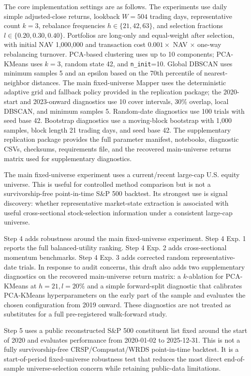 \documentclass[runningheads]{llncs}
\begin{document}
The core implementation settings are as follows. The experiments use daily simple adjusted-close returns, lookback $W=504$ trading days, representative count $k=3$, rebalance frequencies $h\in\{21,42,63\}$, and selection fractions $l\in\{0.20,0.30,0.40\}$. Portfolios are long-only and equal-weight after selection, with initial NAV 1,000,000 and transaction cost $0.001\times$ NAV $\times$ one-way rebalancing turnover. PCA-based clustering uses up to 10 components; PCA-KMeans uses $k=3$, random state 42, and \texttt{n\_init}=10. Global DBSCAN uses minimum samples 5 and an epsilon based on the 70th percentile of nearest-neighbor distances. The main fixed-universe Mapper uses the deterministic adaptive grid and fallback policy provided in the replication package; the 2020-start and 2023-onward diagnostics use 10 cover intervals, 30\% overlap, local DBSCAN, and minimum samples 5. Random-date diagnostics use 100 trials with seed base 42. Bootstrap diagnostics use a moving-block bootstrap with 1,000 samples, block length 21 trading days, and seed base 42. The supplementary replication package provides the full parameter manifest, notebooks, diagnostic CSVs, checksums, requirements file, and the recovered main-universe returns matrix used for supplementary diagnostics.


The main fixed-universe experiment uses a current/recent large-cap U.S. equity universe. This is useful for controlled method comparison but is not a survivorship-free point-in-time S\&P 500 backtest. Its strongest use is signal discovery: whether representative market-state extraction is associated with useful cross-sectional stock-selection information under a consistent large-cap universe.

Step 4 adds robustness around the main fixed-universe experiment. Step 4 Exp. 1 reports the full balanced-utility ranking. Step 4 Exp. 2 adds cross-sectional momentum benchmarks. Step 4 Exp. 3 adds corrected random representative-date trials. In response to audit concerns, this draft also adds two supplementary diagnostics on the recovered main-universe return matrix: a $k$-ablation for PCA-KMeans at $h=21,l=20\%$ and a simple forward-split diagnostic that calibrates PCA-KMeans hyperparameters on the early part of the sample and evaluates the chosen configuration from 2019 onward. These diagnostics are not treated as substitutes for a full pre-registered walk-forward study.

Step 5 uses a public reconstructed S\&P 500 constituent list fixed around the start of 2020 and evaluates performance from 2020-01-02 to 2025-12-31. This is not a fully survivorship-free CRSP/Compustat/WRDS point-in-time backtest. It is a start-of-period fixed-universe robustness test that reduces the most direct end-of-sample universe-selection concern while retaining public-data limitations.
\end{document}
